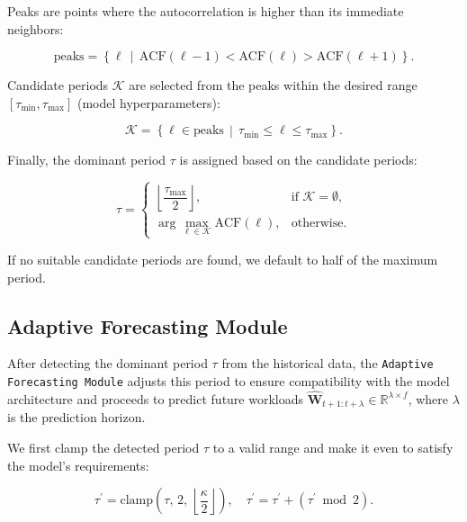 Peaks are points where the autocorrelation is higher than its immediate neighbors:

\begin{equation}
\label{eq:peak_detection}
\text{peaks} = \left\{ \ell \,\middle|\, \text{ACF}(\ell-1) < \text{ACF}(\ell) > \text{ACF}(\ell+1) \right\}.
\end{equation}

Candidate periods $\mathcal{K}$ are selected from the peaks within the desired range $[\tau_{\min}, \tau_{\max}]$ (model hyperparameters):

\begin{equation}
\label{eq:candidate_periods}
\mathcal{K} = \left\{ \ell \in \text{peaks} \,\middle|\, \tau_{\min} \leq \ell \leq \tau_{\max} \right\}.
\end{equation}

Finally, the dominant period $\tau$ is assigned based on the candidate periods:

\begin{equation}
\label{eq:period_assignment}
\tau = \begin{cases}
    \left\lfloor \dfrac{\tau_{\max}}{2} \right\rfloor, & \text{if } \mathcal{K} = \emptyset, \\[2ex]
    \displaystyle\arg\max_{\ell \in \mathcal{K}} \text{ACF}(\ell), & \text{otherwise}.
\end{cases}
\end{equation}

If no suitable candidate periods are found, we default to half of the maximum period.

\subsection{Adaptive Forecasting Module}
\label{sec:ch3_adaptive_forecasting}

After detecting the dominant period $\tau$ from the historical data, the \texttt{Adaptive Forecasting Module} adjusts this period to ensure compatibility with the model architecture and proceeds to predict future workloads $\hat{\mathbf{W}}_{t+1:t+\lambda} \in \mathbb{R}^{\lambda \times f}$, where $\lambda$ is the prediction horizon.

We first clamp the detected period $\tau$ to a valid range and make it even to satisfy the model's requirements:

\begin{equation}
\label{eq:tau_clamp}
\tau^\prime = \text{clamp}\left( \tau,\, 2,\, \left\lfloor \dfrac{\kappa}{2} \right\rfloor \right), \quad \tau^\prime = \tau^\prime + (\tau^\prime \bmod 2).
\end{equation}

